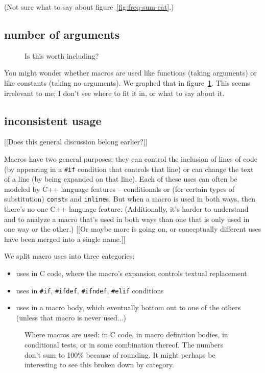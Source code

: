 \documentclass[10pt]{article}
\begin{document}
(Not sure what to say about figure~\ref{fig:freq-sum-cat}.)

\subsection{number of arguments}

\begin{figure}
\centerline{}
\caption{Is this worth including?}
\label{fig:cat-numargs}
\end{figure}

You might wonder whether macros are used like functions (taking arguments)
or like constants (taking no arguments).  We graphed that in
figure~\ref{fig:cat-numargs}.  This seems irrelevant to me; I don't see
where to fit it in, or what to say about it.

\subsection{inconsistent usage}

[[Does this general discussion belong earlier?]]

Macros have two general purposes: they can control the inclusion of lines
of code (by appearing in a {\tt \#if} condition that controls that line) or
can change the text of a line (by being expanded on that line).  Each of
these uses can often be modeled by C++ language features -- conditionals or
(for certain types of substitution) {\tt const}s and {\tt inline}s.  But when a macro
is used in both ways, then there's no one C++ language feature.
(Additionally, it's harder to understand and to analyze a macro that's used
in both ways than one that is only used in one way or the other.)
[[Or maybe more is going on, or conceptually different uses have been
merged into a single name.]]

    We split macro uses into three categories:  
\begin{itemize}
\item
  uses in C code, where the macro's expansion controls textual
            replacement
\item
  uses in {\tt \#if}, {\tt \#ifdef}, {\tt \#ifndef}, {\tt \#elif} conditions
\item
  uses in a macro body, which eventually bottom out to one of the
            others (unless that macro is never used...)
\end{itemize}

\begin{figure}
{\small
  \setlength{\tabcolsep}{.25em}
}
\caption{Where macros are used: in C code, in macro definition bodies, in
  conditional tests, or in some combination thereof.  The numbers don't sum to
  100\% because of rounding.  It might perhaps be interesting to see this
  broken down by category.}
\label{fig:where-used}
\end{figure}
\end{document}
